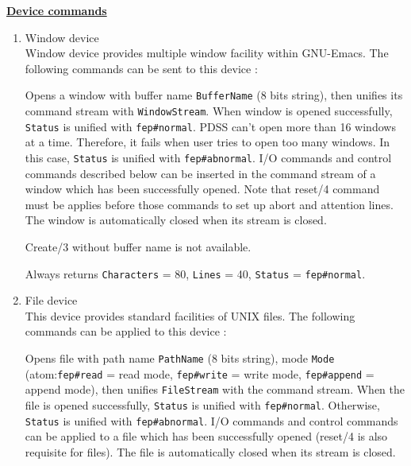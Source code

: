 \noindent\underline{\bf Device commands}\vspace{1ex}\par
{}
\begin{enumerate}
\item Window device\\ 
Window device provides multiple window facility within GNU-Emacs. The following
commands can be sent to this device :
\begin{itemize}

Opens a window with buffer name \verb|BufferName| (8 bits string),
then unifies its command stream with \verb|WindowStream|.  When
window is opened successfully, \verb|Status| is unified with
\verb|fep#normal|.  PDSS can't open more than 16 windows at a
time. Therefore, it fails when user tries to open too many windows. In this
case,
\verb|Status| is unified with \verb|fep#abnormal|. I/O commands and
control commands described below can be inserted in the command stream of
a window which has been successfully opened. Note that reset/4 command must
be applies before those commands to set up abort and attention lines. 
The window is automatically closed when its stream is closed.

Create/3 without buffer name is not available.

Always returns \verb|Characters| = 80, \verb|Lines| = 40,
\verb|Status| = \verb|fep#normal|.

\end{itemize}
\item File device\\ 
This device provides standard facilities of UNIX files. The following commands
can be applied to this device :
\begin{itemize}

Opens file with path name \verb|PathName| (8 bits string), mode
\verb|Mode| (atom:\verb|fep#read| = read mode, \verb|fep#write| =
write mode, \verb|fep#append| = append mode), then unifies
\verb|FileStream| with the command stream.  When the file is opened
successfully, \verb|Status| is unified with \verb|fep#normal|.
Otherwise, \verb|Status| is unified with \verb|fep#abnormal|.  I/O
commands and control commands can be applied to a file
which has been successfully opened (reset/4 is also requisite for files).
The file is automatically closed when its stream is closed.


\end{itemize}
\end{enumerate}
